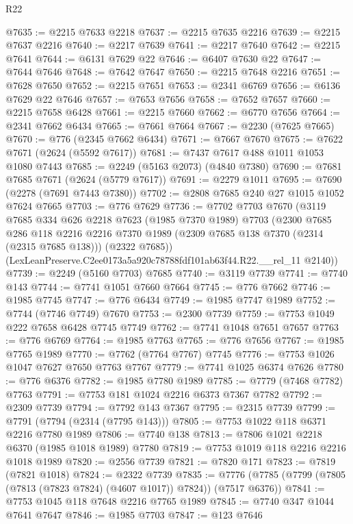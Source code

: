 \begin{lexlean}{R22}
\begin{coremodule}
@7635 := @2215 @7633 @2218
@7637 := @2215 @7635 @2216
@7639 := @2215 @7637 @2216
@7640 := @2217 @7639
@7641 := @2217 @7640
@7642 := @2215 @7641
@7644 := @6131 @7629 @22
@7646 := @6407 @7630 @22
@7647 := @7644 @7646
@7648 := @7642 @7647
@7650 := @2215 @7648 @2216
@7651 := @7628 @7650
@7652 := @2215 @7651
@7653 := @2341 @6769
@7656 := @6136 @7629 @22 @7646
@7657 := @7653 @7656
@7658 := @7652 @7657
@7660 := @2215 @7658 @6428
@7661 := @2215 @7660
@7662 := @6770 @7656
@7664 := @2341 @7662 @6434
@7665 := @7661 @7664
@7667 := @2230 (@7625 @7665)
@7670 := @776 (@2345 @7662 @6434)
@7671 := @7667 @7670
@7675 := @7622 @7671 (@2624 (@5592 @7617))
@7681 := @7437 @7617 @488 @1011 @1053 @1080 @7443
@7685 := @2249 (@5163 @2073) (@4840 @7380)
@7690 := @7681 @7685 @7671 (@2624 (@5779 @7617))
@7691 := @2279 @1011
@7695 := @7690 (@2278 (@7691 @7443 @7380))
@7702 := @2808 @7685 @240 @27 @1015 @1052 @7624 @7665
@7703 := @776 @7629
@7736 := @7702
    @7703
    @7670
    (@3119
      @7685
      @334
      @626
      @2218
      @7623
      (@1985 @7370 @1989)
      @7703
      (@2300
        @7685
        @286
        @118
        @2216
        @2216
        @7370
        @1989
        (@2309 @7685 @138 @7370 (@2314 (@2315 @7685 @138)))
        (@2322 @7685))
      (LexLeanPreserve.C2ee0173a5a920c78788fdf101ab63f44.R22.__rel_11 @2140))
@7739 := @2249 (@5160 @7703) @7685
@7740 := @3119 @7739
@7741 := @7740 @143
@7744 := @7741 @1051 @7660 @7664
@7745 := @776 @7662
@7746 := @1985 @7745
@7747 := @776 @6434
@7749 := @1985 @7747 @1989
@7752 := @7744 (@7746 @7749) @7670
@7753 := @2300 @7739
@7759 := @7753 @1049 @222 @7658 @6428 @7745 @7749
@7762 := @7741 @1048 @7651 @7657
@7763 := @776 @6769
@7764 := @1985 @7763
@7765 := @776 @7656
@7767 := @1985 @7765 @1989
@7770 := @7762 (@7764 @7767) @7745
@7776 := @7753 @1026 @1047 @7627 @7650 @7763 @7767
@7779 := @7741 @1025 @6374 @7626
@7780 := @776 @6376
@7782 := @1985 @7780 @1989
@7785 := @7779 (@7468 @7782) @7763
@7791 := @7753 @181 @1024 @2216 @6373 @7367 @7782
@7792 := @2309 @7739
@7794 := @7792 @143 @7367
@7795 := @2315 @7739
@7799 := @7791 (@7794 (@2314 (@7795 @143)))
@7805 := @7753 @1022 @118 @6371 @2216 @7780 @1989
@7806 := @7740 @138
@7813 := @7806 @1021 @2218 @6370 (@1985 @1018 @1989) @7780
@7819 := @7753 @1019 @118 @2216 @2216 @1018 @1989
@7820 := @2556 @7739
@7821 := @7820 @171
@7823 := @7819 (@7821 @1018)
@7824 := @2322 @7739
@7835 := @7776 (@7785 (@7799 (@7805 (@7813 (@7823 @7824) (@4607 @1017)) @7824)) (@7517 @6376))
@7841 := @7753 @1045 @118 @7648 @2216 @7765 @1989
@7845 := @7740 @347 @1044 @7641 @7647
@7846 := @1985 @7703
@7847 := @123 @7646

\end{coremodule}
\end{lexlean}
